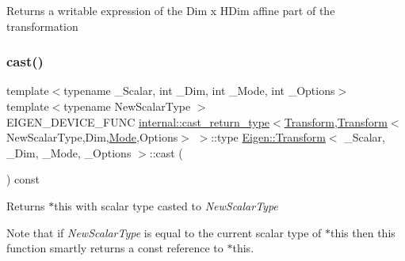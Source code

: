 \begin{DoxyReturn}{Returns}
a writable expression of the Dim x H\+Dim affine part of the transformation 
\end{DoxyReturn}
\mbox{\label{class_eigen_1_1_transform_a4cf2dbae6e95d9efbaae83ab3308ef61}} 
\subsubsection{\texorpdfstring{cast()}{cast()}}
{\footnotesize\ttfamily template$<$typename \+\_\+\+Scalar, int \+\_\+\+Dim, int \+\_\+\+Mode, int \+\_\+\+Options$>$ \\
template$<$typename New\+Scalar\+Type $>$ \\
E\+I\+G\+E\+N\+\_\+\+D\+E\+V\+I\+C\+E\+\_\+\+F\+U\+NC \mbox{\hyperlink{struct_eigen_1_1internal_1_1cast__return__type}{internal\+::cast\+\_\+return\+\_\+type}}$<$\mbox{\hyperlink{class_eigen_1_1_transform}{Transform}},\mbox{\hyperlink{class_eigen_1_1_transform}{Transform}}$<$New\+Scalar\+Type,Dim,\mbox{\hyperlink{struct_mode}{Mode}},Options$>$ $>$\+::type \mbox{\hyperlink{class_eigen_1_1_transform}{Eigen\+::\+Transform}}$<$ \+\_\+\+Scalar, \+\_\+\+Dim, \+\_\+\+Mode, \+\_\+\+Options $>$\+::cast (\begin{DoxyParamCaption}{ }\end{DoxyParamCaption}) const\hspace{0.3cm}{\ttfamily [inline]}}

\begin{DoxyReturn}{Returns}
{\ttfamily $\ast$this} with scalar type casted to {\itshape New\+Scalar\+Type} 
\end{DoxyReturn}
Note that if {\itshape New\+Scalar\+Type} is equal to the current scalar type of {\ttfamily $\ast$this} then this function smartly returns a const reference to {\ttfamily $\ast$this}. \mbox{\label{class_eigen_1_1_transform_aff2a75622ed0a24dbe4bd22e5aeccb78}} 
